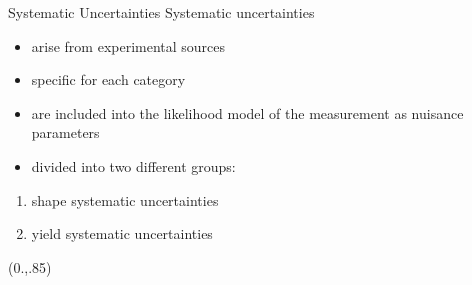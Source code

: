 \documentclass[10pt,UKenglish, leqno, xcolor = dvipsnames]{beamer}
\begin{document}
	\begin{frame}{Systematic Uncertainties}
		\vfill
		Systematic uncertainties
		\begin{itemize}
			\item arise from experimental sources
			\item specific for each category
			\item  are included into the likelihood model of the measurement as nuisance parameters
			\item divided into two different groups:
		\end{itemize}
		\vspace{.5cm}
		\begin{enumerate}\centering
			\item shape systematic uncertainties
			\item yield systematic uncertainties
		\end{enumerate}
		\vfill
		\begin{textblock}{1}(0.,.85)
			\begin{figure}
			\end{figure}
		\end{textblock}
	\end{frame}
\end{document}
